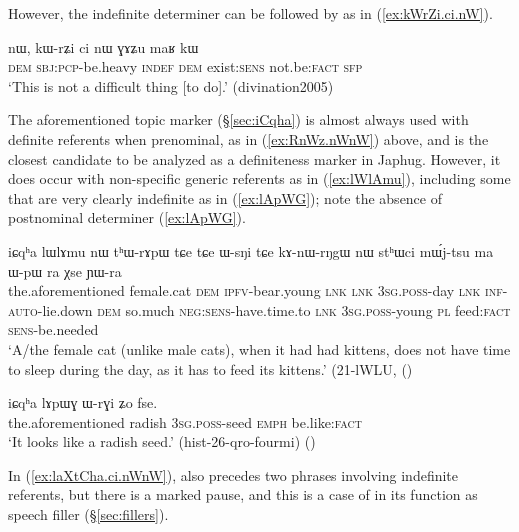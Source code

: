 However, the indefinite determiner  can be followed by  as in (\ref{ex:kWrZi.ci.nW}).

\begin{exe}
\ex \label{ex:kWrZi.ci.nW}
\gll nɯ, kɯ-rʑi ci nɯ ɣɤʑu maʁ kɯ \\
\textsc{dem} \textsc{sbj}:\textsc{pcp}-be.heavy \textsc{indef} \textsc{dem} exist:\textsc{sens} not.be:\textsc{fact} \textsc{sfp} \\
\glt `This is not a difficult thing [to do].' (divination2005)
\end{exe}

The aforementioned topic marker  (§\ref{sec:iCqha}) is almost always used with definite referents when prenominal, as in (\ref{ex:RnWz.nWnW}) above, and is the closest candidate to be analyzed as a definiteness marker in Japhug. However, it does occur with non-specific generic referents as in (\ref{ex:lWlAmu}), including some that are very clearly indefinite as in (\ref{ex:lApWG}); note the absence of postnominal determiner  (\ref{ex:lApWG}).

\begin{exe}
\ex \label{ex:lWlAmu}
 \gll iɕqʰa lɯlɤmu nɯ tʰɯ-rɤpɯ tɕe tɕe ɯ-sŋi tɕe kɤ-nɯ-rŋgɯ nɯ stʰɯci mɯ́j-tsu ma ɯ-pɯ ra χse ɲɯ-ra   \\
 the.aforementioned female.cat \textsc{dem} \textsc{ipfv}-bear.young \textsc{lnk} \textsc{lnk} \textsc{3sg}.\textsc{poss}-day \textsc{lnk} \textsc{inf}-\textsc{auto}-lie.down \textsc{dem} so.much \textsc{neg}:\textsc{sens}-have.time.to \textsc{lnk} \textsc{3sg}.\textsc{poss}-young \textsc{pl} feed:\textsc{fact} \textsc{sens}-be.needed \\
 \glt `A/the female cat (unlike male cats), when it had had kittens, does not have time to sleep during the day, as it has to feed its kittens.' (21-lWLU, 
()
\end{exe}

\begin{exe}
\ex \label{ex:lApWG}
\gll  iɕqʰa lɤpɯɣ ɯ-rɣi ʑo fse. \\
the.aforementioned radish \textsc{3sg}.\textsc{poss}-seed \textsc{emph} be.like:\textsc{fact} \\
\glt `It looks like a radish seed.' (hist-26-qro-fourmi)
()
\end{exe}

In  (\ref{ex:laXtCha.ci.nWnW}),   also precedes two phrases involving indefinite referents, but  there is a marked pause, and this is a case of  in its function as speech filler (§\ref{sec:fillers}).

